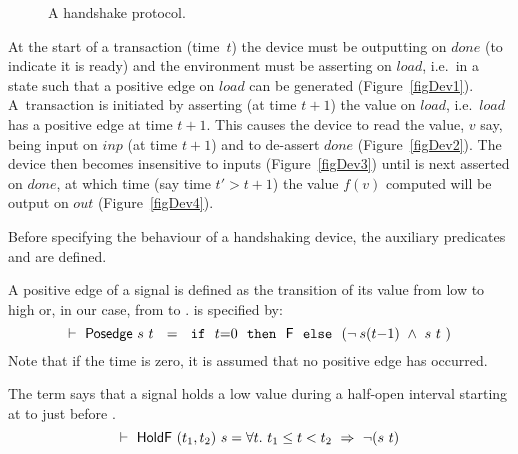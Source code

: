 \documentclass{llncs}
\begin{document}
\begin{figure}[htb]
   \centerline{
      }
   \hspace*{0.4cm}
   \centerline{
      \hspace*{0cm}}
      \caption{\label{figDev}A handshake protocol.}
\end{figure}
At the start of a transaction (time~$t$) the device must be outputting  on $done$
(to indicate it is ready) and the environment must be asserting
 on $load$, i.e.~in a state such that a positive edge on $load$
can be generated (Figure~\ref{figDev1}). 
A~transaction is initiated by asserting (at time
$t{+}1$) the value  on $load$, i.e.~$load$ has a positive edge
at time $t{+}1$. This causes the device to read the value, $v$
say, being input on $inp$ (at time $t{+}1$) and to de-assert $done$
(Figure~\ref{figDev2}).
The device then becomes insensitive to inputs (Figure~\ref{figDev3})
until  is next asserted on $done$,
at which time (say time $t' > t{+}1$) the value
$f(v)$ computed will be output on $out$ (Figure~\ref{figDev4}).

Before specifying the behaviour of a handshaking device,
the auxiliary predicates  and  are defined.

A positive edge of a signal is defined as the transition of its
value from low to high or, in our case, from  to . 
 is specified by:
\[
\TURNST\ \DEF{Posedge}\ s\ t~ ~=~~ \IF{~t{=}0~}{~\DEF{F}~}{~(\NOT\hspace*{0.8mm} s(t{-}1)\ \AND\ s\ t~})
\]
Note that if the time is zero, it is assumed that no positive edge has
occurred.

The term  says that a
signal  holds a low value  during a half-open interval
starting at  to just before .
\[
\TURNST\ \DEF{HoldF}\ (t_1,t_2)\ s = \forall t.\ t_1 \leq t < t_2\ \IMP\ \NOT(s\ t)
\]
\end{document}
